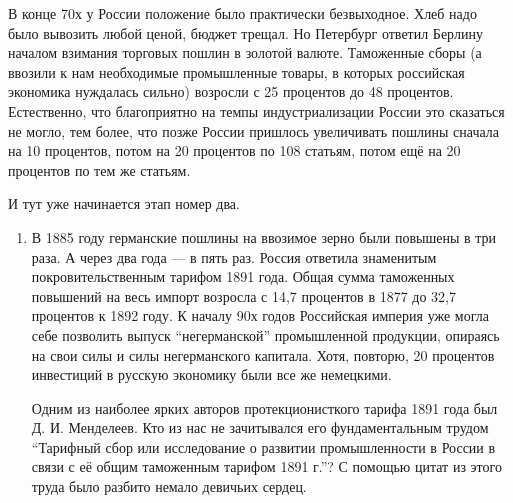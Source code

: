 В конце 70х у России положение было практически безвыходное. Хлеб надо было
вывозить любой ценой, бюджет трещал. Но Петербург ответил Берлину началом
взимания торговых пошлин в золотой валюте. Таможенные сборы (а ввозили к нам
необходимые промышленные товары, в которых российская экономика нуждалась
сильно) возросли с 25 процентов до 48 процентов. Естественно, что благоприятно
на темпы индустриализации России это сказаться не могло, тем более, что позже
России пришлось увеличивать пошлины сначала на 10 процентов, потом на 20
процентов по 108 статьям, потом ещё на 20 процентов по тем же статьям.

\vspace{1ex}\noindent
И тут уже начинается этап номер два.

\begin{enumerate}
\item В 1885 году германские пошлины на ввозимое зерно были повышены в три раза.
А через два года --- в пять раз. Россия ответила знаменитым покровительственным
тарифом 1891 года. Общая сумма таможенных повышений на весь импорт возросла с
14,7 процентов в 1877 до 32,7 процентов к 1892 году. К началу 90х годов
Российская империя уже могла себе позволить выпуск \enquote{негерманской} промышленной
продукции, опираясь на свои силы и силы негерманского капитала. Хотя, повторю,
20 процентов инвестиций в русскую экономику были все же немецкими.

Одним из наиболее ярких авторов протекционисткого тарифа 1891 года был
Д. И. Менделеев. Кто из нас не зачитывался его фундаментальным трудом
\enquote{Тарифный сбор или исследование о развитии промышленности в России в связи с
её общим таможенным тарифом 1891 г.}? С помощью цитат из этого труда было
разбито немало девичьих сердец.


\end{enumerate}
